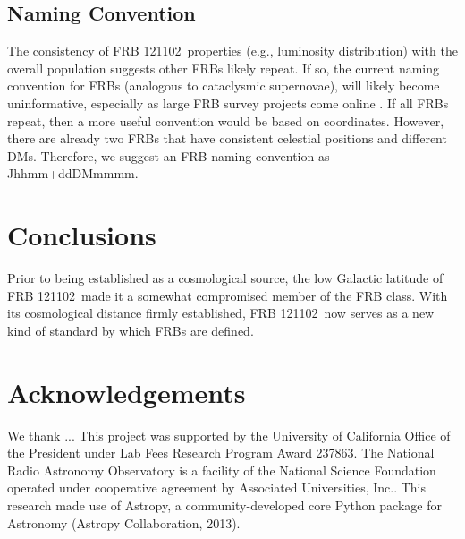 \documentclass[twocolumn]{aastex61}
\newcommand{\frb}{FRB 121102}
\begin{document}
\subsection{Naming Convention}
The consistency of \frb\ properties (e.g., luminosity distribution) with the overall population suggests other FRBs likely repeat. If so, the current naming convention for FRBs (analogous to cataclysmic supernovae), will likely become uninformative, especially as large FRB survey projects come online \citep{2014SPIE.9145E..22B}. If all FRBs repeat, then a more useful convention would be based on coordinates. However, there are already two FRBs that have consistent celestial positions and different DMs. Therefore, we suggest an FRB naming convention as Jhhmm+ddDMmmmm.

\section{Conclusions}
Prior to being established as a cosmological source, the low Galactic latitude of \frb\ made it a somewhat compromised member of the FRB class. With its cosmological distance firmly established, \frb\ now serves as a new kind of standard by which FRBs are defined. 





\section*{Acknowledgements}
We thank ...
This project was supported by the University of California Office of the President under Lab Fees Research Program Award 237863. The National Radio Astronomy Observatory is a facility of the National Science Foundation operated under cooperative agreement by Associated Universities, Inc.. This research made use of Astropy, a community-developed core Python package for Astronomy (Astropy Collaboration, 2013).




\end{document}

